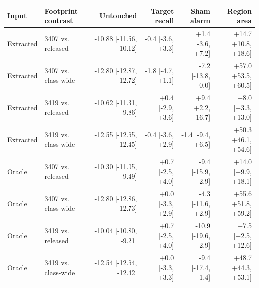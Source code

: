 \begin{tabular}{llrrrr}
\toprule
Input & Footprint contrast & Untouched & Target recall & Sham alarm & Region area \\
\midrule
Extracted & 3407 vs. released & -10.88 [-11.56, -10.12] & -0.4 [-3.6, +3.3] & +1.4 [-3.6, +7.2] & +14.7 [+10.8, +18.6] \\
Extracted & 3407 vs. class-wide & -12.80 [-12.87, -12.72] & -1.8 [-4.7, +1.1] & -7.2 [-13.8, -0.0] & +57.0 [+53.5, +60.5] \\
Extracted & 3419 vs. released & -10.62 [-11.31, -9.86] & +0.4 [-2.9, +3.6] & +9.4 [+2.2, +16.7] & +8.0 [+3.3, +13.0] \\
Extracted & 3419 vs. class-wide & -12.55 [-12.65, -12.45] & -0.4 [-3.6, +2.9] & -1.4 [-9.4, +6.5] & +50.3 [+46.1, +54.6] \\
\midrule
Oracle & 3407 vs. released & -10.30 [-11.05, -9.49] & +0.7 [-2.5, +4.0] & -9.4 [-15.9, -2.9] & +14.0 [+9.9, +18.1] \\
Oracle & 3407 vs. class-wide & -12.80 [-12.86, -12.73] & +0.0 [-3.3, +2.9] & -4.3 [-11.6, +2.9] & +55.6 [+51.8, +59.2] \\
Oracle & 3419 vs. released & -10.04 [-10.80, -9.21] & +0.7 [-2.5, +4.0] & -10.9 [-19.6, -2.9] & +7.5 [+2.5, +12.6] \\
Oracle & 3419 vs. class-wide & -12.54 [-12.64, -12.42] & +0.0 [-3.3, +3.3] & -9.4 [-17.4, -1.4] & +48.7 [+44.3, +53.1] \\
\bottomrule
\end{tabular}
